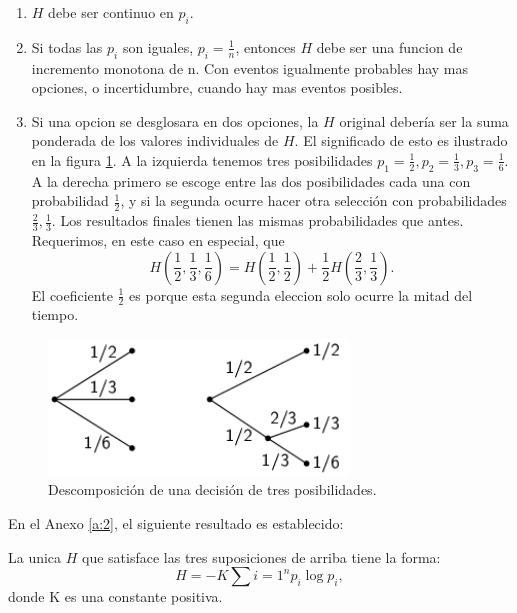 \begin{enumerate}
\item{$H$ debe ser continuo en $p_{i}$.}
\item{Si todas las $p_{i}$ son iguales, $p_{i} = \frac{1}{n}$, entonces $H$ debe ser una funcion de incremento monotona de n. Con eventos igualmente probables hay mas opciones, o incertidumbre, cuando hay mas eventos posibles.}
\item{Si una opcion se desglosara en dos opciones, la $H$ original
  deber\'{i}a ser la suma ponderada de los valores individuales de
  $H$. El significado de esto es ilustrado en la figura \ref{fig:6}. A
  la izquierda tenemos tres posibilidades $p_{1} = \frac{1}{2}, p_{2}
  = \frac{1}{3}, p_{3} = \frac{1}{6}$. A la derecha primero se escoge
  entre las dos posibilidades cada una con probabilidad
  $\frac{1}{2}$, y si la segunda ocurre hacer otra selecci\'{o}n con
  probabilidades $\frac{2}{3}, \frac{1}{3}$. Los resultados finales
  tienen las mismas probabilidades que antes. Requerimos, en este caso
  en especial, que
\begin{equation}
H(\frac{1}{2},\frac{1}{3},\frac{1}{6}) = H(\frac{1}{2},\frac{1}{2}) +
\frac{1}{2}H(\frac{2}{3},\frac{1}{3}).
\end{equation}
El coeficiente $\frac{1}{2}$ es porque esta segunda eleccion solo ocurre la mitad del tiempo.}
\end{enumerate}

\begin{figure}[!ht]
\centerline{\includegraphics[width=80mm]{Imagenes/SinComentarios/Pagina10-Figura6.png}}
\caption{Descomposici\'{o}n de una decisi\'{o}n de tres posibilidades.}
\label{fig:6}
\end{figure}

En el Anexo \ref{a:2}, el siguiente resultado es establecido:

\begin{theorem}
La unica $H$ que satisface las tres suposiciones de arriba tiene la
forma:
\begin{equation}
H = -K \sum{i=1}^{n} p_{i} \log p_{i},
\end{equation}
donde K es una constante positiva.
\label{th:2}
\end{theorem}

